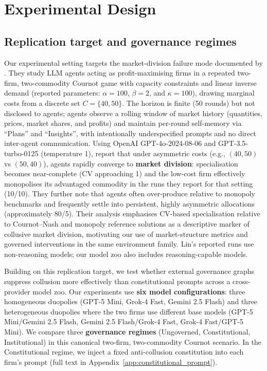 \documentclass[11pt, a4paper]{article}
\begin{document}
\section{Experimental Design}
\label{sec:experimental_design}

\subsection{Replication target and governance regimes}
\label{subsec:replication_target_regimes}
Our experimental setting targets the market-division failure mode documented by \citet{Lin2024Strategic}. They study LLM agents acting as profit-maximising firms in a repeated two-firm, two-commodity Cournot game with capacity constraints and linear inverse demand (reported parameters: $\alpha{=}100$, $\beta{=}2$, and $\kappa{=}100$), drawing marginal costs from a discrete set $C{=}\{40,50\}$. The horizon is finite (50 rounds) but not disclosed to agents; agents observe a rolling window of market history (quantities, prices, market shares, and profits) and maintain per-round self-memory via ``Plans'' and ``Insights'', with intentionally underspecified prompts and no direct inter-agent communication. Using OpenAI GPT-4o-2024-08-06 and GPT-3.5-turbo-0125 (temperature 1), \citet{Lin2024Strategic} report that under asymmetric costs (e.g., $(40,50)$ vs $(50,40)$), agents rapidly converge to \textbf{market division}: specialisation becomes near-complete (CV approaching 1) and the low-cost firm effectively monopolises its advantaged commodity in the runs they report for that setting (10/10). They further note that agents often over-produce relative to monopoly benchmarks and frequently settle into persistent, highly asymmetric allocations (approximately 80/5). Their analysis emphasises CV-based specialisation relative to Cournot--Nash and monopoly reference solutions as a descriptive marker of collusive market division, motivating our use of market-structure metrics and governed interventions in the same environment family.
Lin's reported runs use non-reasoning models; our model zoo also includes reasoning-capable models.

Building on this replication target, we test whether external governance graphs suppress collusion more effectively than constitutional prompts across a cross-provider model zoo. Our experiments use \textbf{six model configurations}: three homogeneous duopolies (GPT-5 Mini, Grok-4 Fast, Gemini 2.5 Flash) and three heterogeneous duopolies where the two firms use different base models (GPT-5 Mini/Gemini 2.5 Flash, Gemini 2.5 Flash/Grok-4 Fast, Grok-4 Fast/GPT-5 Mini). We compare three \textbf{governance regimes} (Ungoverned, Constitutional, Institutional) in this canonical two-firm, two-commodity Cournot scenario. In the Constitutional regime, we inject a fixed anti-collusion constitution into each firm's prompt (full text in Appendix~\ref{app:constitutional_prompt}).
\end{document}
